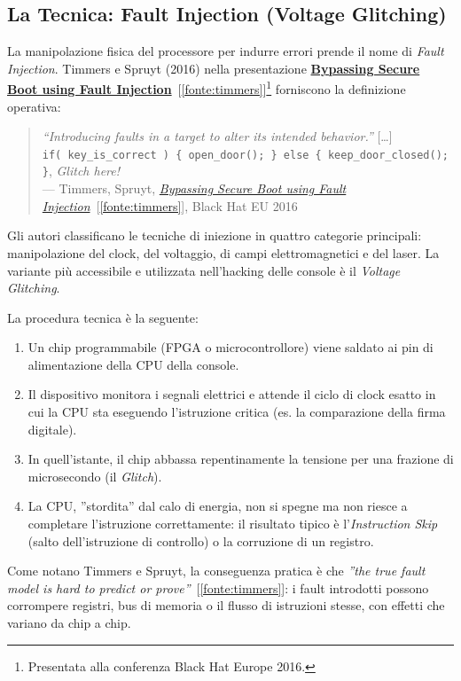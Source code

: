 \subsection{La Tecnica: Fault Injection (Voltage Glitching)}

La manipolazione fisica del processore per indurre errori prende il nome di \textit{Fault Injection}. Timmers e Spruyt (2016) nella presentazione \hyperref[fonte:timmers]{\textbf{Bypassing Secure Boot using Fault Injection}}~[\ref{fonte:timmers}]\footnote{Presentata alla conferenza Black Hat Europe 2016.} forniscono la definizione operativa:

\begin{quote}
    \textit{``Introducing faults in a target to alter its intended behavior.''} [\ldots]\\
    \texttt{if( key\_is\_correct ) \{ open\_door(); \} else \{ keep\_door\_closed(); \}}, \textit{Glitch here!}\\
    --- Timmers, Spruyt, \hyperref[fonte:timmers]{\textit{Bypassing Secure Boot using Fault Injection}}~[\ref{fonte:timmers}], Black Hat EU 2016
\end{quote}

Gli autori classificano le tecniche di iniezione in quattro categorie principali: manipolazione del clock, del voltaggio, di campi elettromagnetici e del laser. La variante più accessibile e utilizzata nell'hacking delle console è il \textit{Voltage Glitching}.

La procedura tecnica è la seguente:

\begin{enumerate}
    \item Un chip programmabile (FPGA o microcontrollore) viene saldato ai pin di alimentazione della CPU della console.
    \item Il dispositivo monitora i segnali elettrici e attende il ciclo di clock esatto in cui la CPU sta eseguendo l'istruzione critica (es. la comparazione della firma digitale).
    \item In quell'istante, il chip abbassa repentinamente la tensione per una frazione di microsecondo (il \textit{Glitch}).
    \item La CPU, ''stordita'' dal calo di energia, non si spegne ma non riesce a completare l'istruzione correttamente: il risultato tipico è l'\textit{Instruction Skip} (salto dell'istruzione di controllo) o la corruzione di un registro.
\end{enumerate}

Come notano Timmers e Spruyt, la conseguenza pratica è che \textit{''the true fault model is hard to predict or prove''}~[\ref{fonte:timmers}]: i fault introdotti possono corrompere registri, bus di memoria o il flusso di istruzioni stesse, con effetti che variano da chip a chip.

